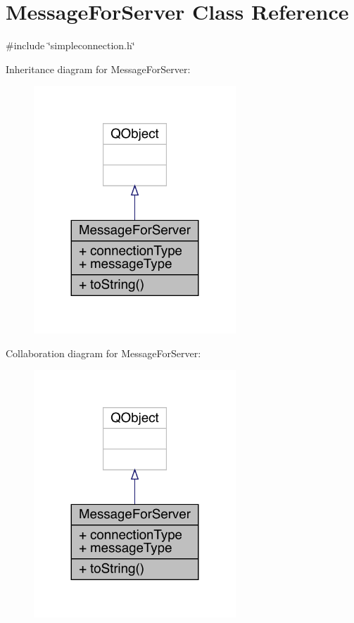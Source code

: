 \hypertarget{a00121}{}\section{Message\+For\+Server Class Reference}
\label{a00121}


{\ttfamily \#include \char`\"{}simpleconnection.\+h\char`\"{}}



Inheritance diagram for Message\+For\+Server\+:
\nopagebreak
\begin{figure}[H]
\begin{center}
\leavevmode
\includegraphics[width=215pt]{d4/d98/a00120}
\end{center}
\end{figure}


Collaboration diagram for Message\+For\+Server\+:
\nopagebreak
\begin{figure}[H]
\begin{center}
\leavevmode
\includegraphics[width=215pt]{df/d6a/a00119}
\end{center}
\end{figure}
